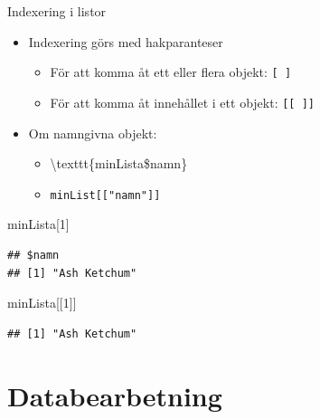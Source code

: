 \documentclass[
  11pt,
  ignorenonframetext,
]{beamer}
\newenvironment{Shaded}{\begin{snugshade}}{\end{snugshade}}
\newcommand{\DecValTok}[1]{\textcolor[rgb]{0.00,0.00,0.81}{#1}}
\newcommand{\NormalTok}[1]{#1}
\providecommand{\tightlist}{%
  \setlength{\itemsep}{0pt}\setlength{\parskip}{0pt}}
\begin{document}
\begin{frame}[fragile]{Indexering i listor}
\protect\hypertarget{indexering-i-listor}{}
\begin{itemize}
\tightlist
\item
  Indexering görs med hakparanteser

  \begin{itemize}
  \tightlist
  \item
    För att komma åt ett eller flera objekt: \texttt{[ ]}
  \item
    För att komma åt innehållet i ett objekt: \texttt{[[ ]]}
  \end{itemize}
\item
  Om namngivna objekt:

  \begin{itemize}
  \tightlist
  \item
    \textbackslash texttt\{minLista\$namn\}
  \item
    \texttt{minList[["namn"]]}
  \end{itemize}
\end{itemize}

\begin{Shaded}
\begin{Highlighting}[]
\NormalTok{minLista[}\DecValTok{1}\NormalTok{]}
\end{Highlighting}
\end{Shaded}

\begin{verbatim}
## $namn
## [1] "Ash Ketchum"
\end{verbatim}

\begin{Shaded}
\begin{Highlighting}[]
\NormalTok{minLista[[}\DecValTok{1}\NormalTok{]]}
\end{Highlighting}
\end{Shaded}

\begin{verbatim}
## [1] "Ash Ketchum"
\end{verbatim}
\end{frame}

\hypertarget{databearbetning}{%
\section{Databearbetning}\label{databearbetning}}

\end{document}
